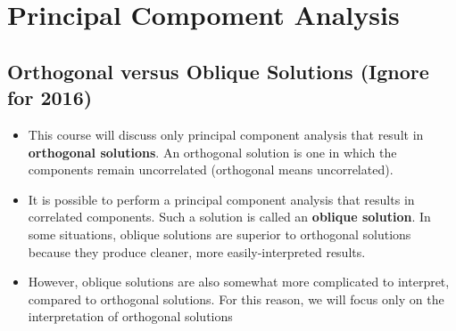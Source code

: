 \documentclass[a4paper,12pt]{article}
\begin{document}
\section{Principal Compoment Analysis}
\subsection{Orthogonal versus Oblique Solutions (Ignore for 2016)}
\begin{itemize}
\item This course will discuss only principal component analysis that result in \textbf{orthogonal solutions}.
An orthogonal solution is one in which the components remain uncorrelated (orthogonal means
uncorrelated).

\item It is possible to perform a principal component analysis that results in correlated components.
Such a solution is called an \textbf{oblique solution}.  In some situations, oblique solutions are superior
to orthogonal solutions because they produce cleaner, more easily-interpreted results.
\item However, oblique solutions are also somewhat more complicated to interpret, compared to
orthogonal solutions.  For this reason, we will focus only on the interpretation of orthogonal solutions
\end{itemize}

	
\end{document}
